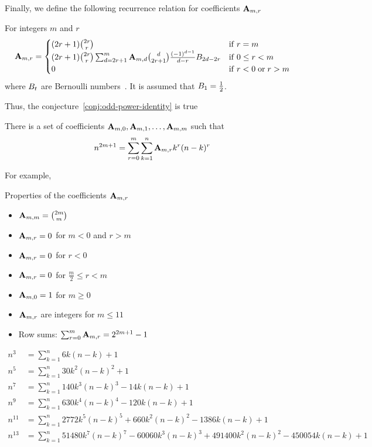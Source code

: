 Finally, we define the following recurrence relation for coefficients ${\mathbf{A}} \sb{m,r}$
\begin{proposition}
    For integers $m$ and $r$
    \label{prop:coefficients_a}
    \begin{align*}
        {\mathbf{A}} \sb{m,r} =
        \begin{cases}
        (2r+1)
            \binom{2r}{r} & \mathrm{if} \; r=m \\
            (2r+1) \binom{2r}{r} \sum_{d = 2r+1}^{m} {\mathbf{A}} \sb{m,d} \binom{d}{2r+1} \frac{(-1)^{d-1}}{d-r}
            {B}\sb{2d-2r} & \mathrm{if} \; 0 \leq r<m \\
            0 & \mathrm{if} \; r<0 \; \mathrm{or} \; r>m
        \end{cases}
    \end{align*}
    where ${B}\sb{t}$ are Bernoulli numbers~\cite{bateman1953higher}.
    It is assumed that ${B}\sb{1}=\frac{1}{2}$.
\end{proposition}

Thus, the conjecture~\eqref{conj:odd-power-identity} is true

\begin{theorem}
    \label{theorem:odd-power-identity}
    There is a set of coefficients ${\mathbf{A}} \sb{m,0}, {\mathbf{A}} \sb{m,1}, \ldots, {\mathbf{A}} \sb{m,m}$ such that
    \begin{align*}
        n^{2m+1} = \sum_{r=0}^{m} \sum_{k=1}^{n} {\mathbf{A}} \sb{m,r} k^r (n-k)^r
    \end{align*}
\end{theorem}

For example,

Properties of the coefficients ${\mathbf{A}} \sb{m,r}$
\begin{itemize}
    \item ${\mathbf{A}} \sb{m,m} = \binom{2m}{m}$
    \item ${\mathbf{A}} \sb{m,r} = 0$ for $m < 0$ and $r > m$
    \item ${\mathbf{A}} \sb{m,r} = 0$ for $r < 0$
    \item ${\mathbf{A}} \sb{m,r} = 0$ for $\frac{m}{2} \leq r < m$
    \item ${\mathbf{A}} \sb{m,0} = 1$ for $m \geq 0$
    \item ${\mathbf{A}} \sb{m,r}$ are integers for $m \leq 11$
    \item Row sums: $\sum_{r=0}^{m} {\mathbf{A}} \sb{m,r} = 2^{2m+1} - 1$
\end{itemize}

\begin{align*}
    n^3 &= \sum_{k=1}^{n} 6k(n-k) + 1 \\
    n^5 &= \sum_{k=1}^{n} 30k^2(n-k)^2 + 1 \\
    n^7 &= \sum_{k=1}^{n} 140 k^3 (n-k)^3 - 14k(n-k) + 1 \\
    n^9 &= \sum_{k=1}^{n} 630 k^4(n-k)^4 - 120k(n-k) + 1 \\
    n^{11} &= \sum_{k=1}^{n} 2772 k^5(n-k)^5 + 660 k^2(n-k)^2 - 1386k(n-k) + 1 \\
    n^{13} &= \sum_{k=1}^{n} 51480 k^7(n-k)^7 - 60060 k^3(n-k)^3 + 491400k^2(n-k)^{2} - 450054k(n-k) + 1
\end{align*}
